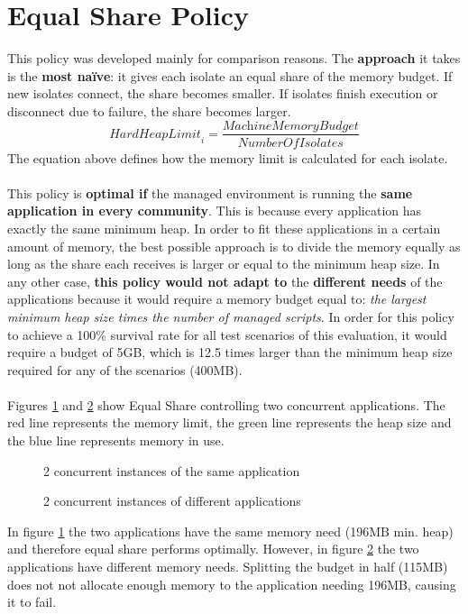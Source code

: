 \documentclass{l4proj}
\begin{document}
\section{Equal Share Policy}
\hspace*{1em} This policy was developed mainly for comparison reasons. The \textbf{approach} it takes is the \textbf{most naïve}: it gives each isolate an equal share of the memory budget. If new isolates connect, the share becomes smaller. If isolates finish execution or disconnect due to failure, the share becomes larger.
\begin{equation}
\textit{HardHeapLimit}_i = \dfrac{\textit{MachineMemoryBudget}}{\textit{NumberOfIsolates}}
\end{equation}
The equation above defines how the memory limit is calculated for each isolate.
\\\\
\hspace*{1em} This policy is \textbf{optimal if} the managed environment is running the \textbf{same application in every community}. This is because every application has exactly the same minimum heap. In order to fit these applications in a certain amount of memory, the best possible approach is to divide the memory equally as long as the share each receives is larger or equal to the minimum heap size. In any other case, \textbf{this policy would not adapt to} the \textbf{different needs} of the applications because it would require a memory budget equal to: \textit{the largest minimum heap size times the number of managed scripts}. In order for this policy to achieve a 100\% survival rate for all test scenarios of this evaluation, it would require a budget of 5GB, which is 12.5 times larger than the minimum heap size required for any of the scenarios (400MB).
\\\\
\hspace*{1em} Figures \ref{equalshare_eq} and \ref{equalshare_df} show Equal Share controlling two concurrent applications. The red line represents the memory limit, the green line represents the heap size and the blue line represents memory in use.

\begin{figure}[!ht]
\caption{2 concurrent instances of the same application}
\label{equalshare_eq}
\end{figure}
\begin{figure}[!ht]
\caption{2 concurrent instances of different applications}
\label{equalshare_df}
\end{figure}
In figure \ref{equalshare_eq} the two applications have the same memory need (196MB min. heap) and therefore equal share performs optimally. However, in figure \ref{equalshare_df} the two applications have different memory needs. Splitting the budget in half (115MB) does not not allocate enough memory to the application needing 196MB, causing it to fail.
\end{document}
